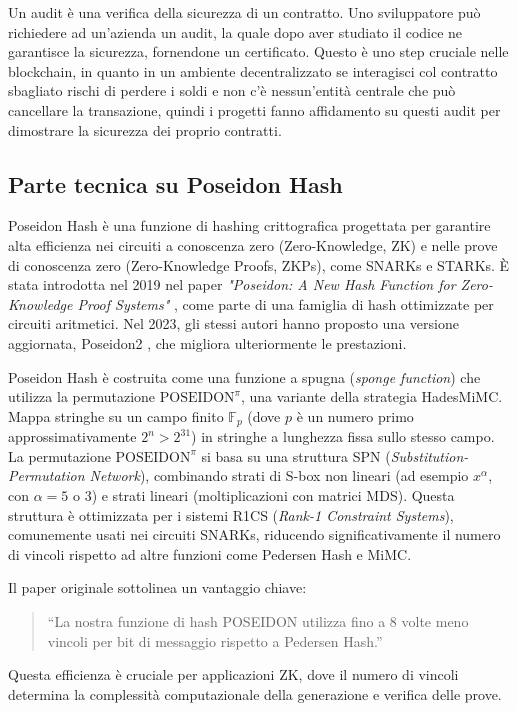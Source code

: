 Un audit è una verifica della sicurezza di un contratto. Uno sviluppatore può richiedere ad un'azienda un audit, la quale dopo aver studiato il codice ne garantisce la sicurezza, fornendone un certificato. Questo è uno step cruciale nelle blockchain, in quanto in un ambiente decentralizzato se interagisci col contratto sbagliato rischi di perdere i soldi e non c'è nessun'entità centrale che può cancellare la transazione, quindi i progetti fanno affidamento su questi audit per dimostrare la sicurezza dei proprio contratti.

\subsection{Parte tecnica su Poseidon Hash}

Poseidon Hash è una funzione di hashing crittografica progettata per garantire alta efficienza nei circuiti a conoscenza zero (Zero-Knowledge, ZK) e nelle prove di conoscenza zero (Zero-Knowledge Proofs, ZKPs), come SNARKs e STARKs. È stata introdotta nel 2019 nel paper \textit{"Poseidon: A New Hash Function for Zero-Knowledge Proof Systems"} \cite{grassi2019poseidon}, come parte di una famiglia di hash ottimizzate per circuiti aritmetici. Nel 2023, gli stessi autori hanno proposto una versione aggiornata, Poseidon2 \cite{grassi2023poseidon2}, che migliora ulteriormente le prestazioni.

Poseidon Hash è costruita come una funzione a spugna (\textit{sponge function}) che utilizza la permutazione \(\text{POSEIDON}^\pi\), una variante della strategia HadesMiMC. Mappa stringhe su un campo finito \(\mathbb{F}_p\) (dove \(p\) è un numero primo approssimativamente \(2^n > 2^{31}\)) in stringhe a lunghezza fissa sullo stesso campo. La permutazione \(\text{POSEIDON}^\pi\) si basa su una struttura SPN (\textit{Substitution-Permutation Network}), combinando strati di S-box non lineari (ad esempio \(x^\alpha\), con \(\alpha = 5\) o \(3\)) e strati lineari (moltiplicazioni con matrici MDS). Questa struttura è ottimizzata per i sistemi R1CS (\textit{Rank-1 Constraint Systems}), comunemente usati nei circuiti SNARKs, riducendo significativamente il numero di vincoli rispetto ad altre funzioni come Pedersen Hash e MiMC.

Il paper originale sottolinea un vantaggio chiave:  
\begin{quote}
``La nostra funzione di hash POSEIDON utilizza fino a 8 volte meno vincoli per bit di messaggio rispetto a Pedersen Hash.''
\end{quote}
Questa efficienza è cruciale per applicazioni ZK, dove il numero di vincoli determina la complessità computazionale della generazione e verifica delle prove.

